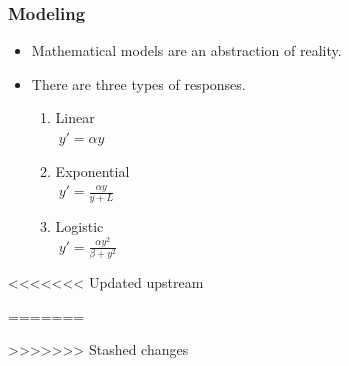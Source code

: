 \documentclass{beamer}
\begin{document}
\begin{frame}
  \frametitle{Modeling}
  \begin{itemize}
	\item Mathematical models are an abstraction of reality.
	\item There are three types of responses. 
	\begin{enumerate}
		\item Linear\\
		$\ y'=\alpha y$
		\item Exponential\\
		$\ y' = \frac{\alpha y}{y+ L}$ 
		\item Logistic\\
		$\ y'= \frac {\alpha y^2}{\beta + y^2}$
	\end{enumerate}
  \end{itemize}
\end{frame}

<<<<<<< Updated upstream



=======





>>>>>>> Stashed changes
\end{document}
